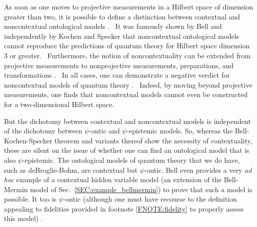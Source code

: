 \documentclass[aps,nofootinbib,12pt]{revtex4-2}
\begin{document}
As soon as one moves to projective measurements in a Hilbert space
of dimension greater than two, it is possible to define a
distinction between contextual and noncontextual ontological models
\cite{Spekkens_con}. \ It was famously shown by Bell
\cite{Bell_probhv} and independently by Kochen and Specker \cite{Ks}
that noncontextual ontological models cannot reproduce the
predictions of quantum theory for Hilbert space dimension 3 or
greater. \ Furthermore, the notion of noncontextuality can be
extended from projective measurements to nonprojective measurements,
preparations, and transformations \cite{Spekkens_con}. \ In all
cases, one can demonstrate a negative verdict for noncontextual
models of quantum theory \cite{Spekkens_con}. \ Indeed, by moving
beyond projective measurements, one finds that noncontextual models
cannot even be constructed for a two-dimensional Hilbert space.\

But the dichotomy between contextual and noncontextual models is
independent of the dichotomy between $\psi$-ontic and
$\psi$-epistemic models. So, whereas the Bell-Kochen-Specker theorem
and variants thereof show the necessity of contextuality, these are
silent on the issue of whether one can find an ontological model
that is also $\psi$-epistemic. The ontological models of quantum
theory that we do have, such as deBroglie-Bohm, are contextual but
$\psi$-ontic. Bell \cite{Bell_probhv} even provides a very \emph{ad
hoc} example of a contextual hidden variable model (an extension of
the Bell-Mermin model of Sec.~\ref{SEC:example_bellmermin}) to prove
that such a model is possible. It too is $\psi$-ontic (although one
must have recourse to the definition appealing to fidelities
provided in footnote \ref{FNOTE:fidelity} to properly assess this
model) \cite{Barrettpc}.
\end{document}
